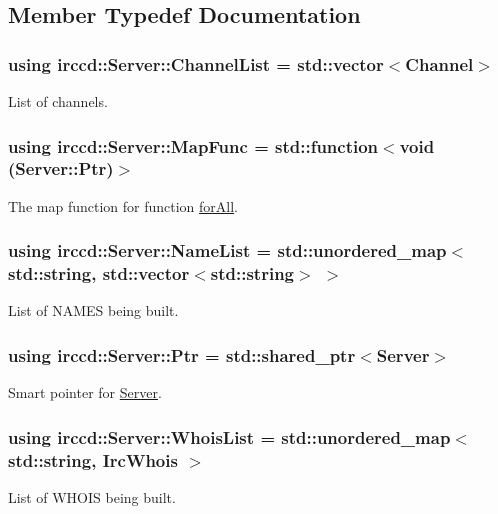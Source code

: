 \subsection{Member Typedef Documentation}
\hypertarget{a00055_aa6c9af0cbeeb89dc0b4ea278ffacaecf}{
\subsubsection[{Channel\-List}]{\setlength{\rightskip}{0pt plus 5cm}using {\bf irccd\-::\-Server\-::\-Channel\-List} =  std\-::vector$<${\bf Channel}$>$}}\label{a00055_aa6c9af0cbeeb89dc0b4ea278ffacaecf}
List of channels. \hypertarget{a00055_a1f98346943a3940d8ef973d4816a6b46}{
\subsubsection[{Map\-Func}]{\setlength{\rightskip}{0pt plus 5cm}using {\bf irccd\-::\-Server\-::\-Map\-Func} =  std\-::function$<$void ({\bf Server\-::\-Ptr})$>$}}\label{a00055_a1f98346943a3940d8ef973d4816a6b46}
The map function for function \hyperlink{a00055_a5721b5e8cd9f441f888274ac67509491}{for\-All}. \hypertarget{a00055_ada7323736e755db49c77793a3aa768a3}{
\subsubsection[{Name\-List}]{\setlength{\rightskip}{0pt plus 5cm}using {\bf irccd\-::\-Server\-::\-Name\-List} =  std\-::unordered\-\_\-map$<$ std\-::string, std\-::vector$<$std\-::string$>$ $>$}}\label{a00055_ada7323736e755db49c77793a3aa768a3}
List of N\-A\-M\-E\-S being built. \hypertarget{a00055_aea3f9694df81348b909814ac6f84f874}{
\subsubsection[{Ptr}]{\setlength{\rightskip}{0pt plus 5cm}using {\bf irccd\-::\-Server\-::\-Ptr} =  std\-::shared\-\_\-ptr$<${\bf Server}$>$}}\label{a00055_aea3f9694df81348b909814ac6f84f874}
Smart pointer for \hyperlink{a00055}{Server}. \hypertarget{a00055_afddae57f2e12d80ef49128c82c5aca97}{
\subsubsection[{Whois\-List}]{\setlength{\rightskip}{0pt plus 5cm}using {\bf irccd\-::\-Server\-::\-Whois\-List} =  std\-::unordered\-\_\-map$<$ std\-::string, {\bf Irc\-Whois} $>$}}\label{a00055_afddae57f2e12d80ef49128c82c5aca97}
List of W\-H\-O\-I\-S being built. 

